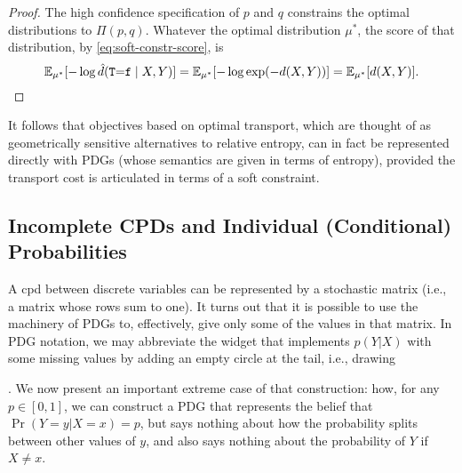 \begin{proof}
    The high confidence specification of $p$ and $q$ constrains the optimal distributions to $\Pi(p,q)$.
    Whatever the optimal distribution $\mu^*$,
    the score of that distribution, by \eqref{eq:soft-constr-score},
    is 
    \[
    \operatorname*{\mathbb{E}}\nolimits_{\mu^*}[ - \log \hat d({\tt T}{=}{\tt f}\mid X,Y) ]
    = \operatorname*{\mathbb{E}}\nolimits_{\mu^*}[ - \log \exp( - d(X,Y))] 
    = \operatorname*{\mathbb{E}}\nolimits_{\mu^*}[d(X,Y)].
    \qedhere
    \]
\end{proof}
%
It follows that objectives based on optimal transport, which are thought of as 
geometrically sensitive alternatives to relative entropy, can in fact be represented directly with PDGs (whose semantics are given in terms of entropy), provided the transport cost is articulated in terms of a soft constraint. 

\subsection{Incomplete CPDs and Individual (Conditional) Probabilities}
    \label{sec:prob-widget}
    
A cpd between discrete variables can be represented by
    a stochastic matrix (i.e., a matrix whose rows sum to one).
It turns out that it is possible to use the machinery of PDGs
    to, effectively, give only some of the values in that matrix.
In PDG notation, we may abbreviate the widget that implements $p(Y|X)$ with some missing values by adding an empty circle at the tail, i.e., drawing 
.    
%
We now present an important extreme case of that construction:
how, for any $p \in [0,1]$, we can construct a PDG
that represents the belief that $\Pr(Y{=}y|X={x}) = p$, but says nothing about
how the probability splits between other values of $y$, and also says nothing
about the probability of $Y$ if $X \ne x$.


\def\XxYy{{X{=}x\Vert Y{=}y}}
\def\XxYyshort{{X_x Y_y}}
\def\Yy{{Y{=}y}}
\def\Yyshort{{Y_y}}

